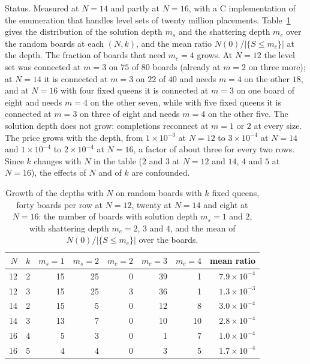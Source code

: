 Status. Measured at $N = 14$ and partly at $N = 16$, with a C implementation of the enumeration that handles level sets of twenty million placements. Table~\ref{tab:depthgrowth} gives the distribution of the solution depth $m_s$ and the shattering depth $m_c$ over the random boards at each $(N, k)$, and the mean ratio $N(0) / |\{ S \le m_c \}|$ at the depth. The fraction of boards that need $m_c = 4$ grows. At $N = 12$ the level set was connected at $m = 3$ on $75$ of $80$ boards (already at $m = 2$ on three more); at $N = 14$ it is connected at $m = 3$ on $22$ of $40$ and needs $m = 4$ on the other $18$, and at $N = 16$ with four fixed queens it is connected at $m = 3$ on one board of eight and needs $m = 4$ on the other seven, while with five fixed queens it is connected at $m = 3$ on three of eight and needs $m = 4$ on the other five. The solution depth does not grow: completions reconnect at $m = 1$ or $2$ at every size. The price grows with the depth, from $1 \times 10^{-3}$ at $N = 12$ to $3 \times 10^{-4}$ at $N = 14$ and $1 \times 10^{-4}$ to $2 \times 10^{-4}$ at $N = 16$, a factor of about three for every two rows. Since $k$ changes with $N$ in the table ($2$ and $3$ at $N = 12$ and $14$, $4$ and $5$ at $N = 16$), the effects of $N$ and of $k$ are confounded.

\begin{table}[t]
\centering
\small
\caption{Growth of the depths with $N$ on random boards with $k$ fixed queens, forty boards per row at $N = 12$, twenty at $N = 14$ and eight at $N = 16$: the number of boards with solution depth $m_s = 1$ and $2$, with shattering depth $m_c = 2$, $3$ and $4$, and the mean of $N(0) / |\{ S \le m_c \}|$ over the boards.}
\label{tab:depthgrowth}
\begin{tabular}{rrrrrrrr}
\toprule
$N$ & $k$ & $m_s{=}1$ & $m_s{=}2$ & $m_c{=}2$ & $m_c{=}3$ & $m_c{=}4$ & mean ratio \\
\midrule
12 & 2 & 15 & 25 & 0 & 39 & 1 & $7.9 \times 10^{-4}$ \\
12 & 3 & 15 & 25 & 3 & 36 & 1 & $1.3 \times 10^{-3}$ \\
14 & 2 & 15 & 5 & 0 & 12 & 8 & $3.0 \times 10^{-4}$ \\
14 & 3 & 13 & 7 & 0 & 10 & 10 & $2.8 \times 10^{-4}$ \\
16 & 4 & 5 & 3 & 0 & 1 & 7 & $1.0 \times 10^{-4}$ \\
16 & 5 & 4 & 4 & 0 & 3 & 5 & $1.7 \times 10^{-4}$ \\
\bottomrule
\end{tabular}
\end{table}

